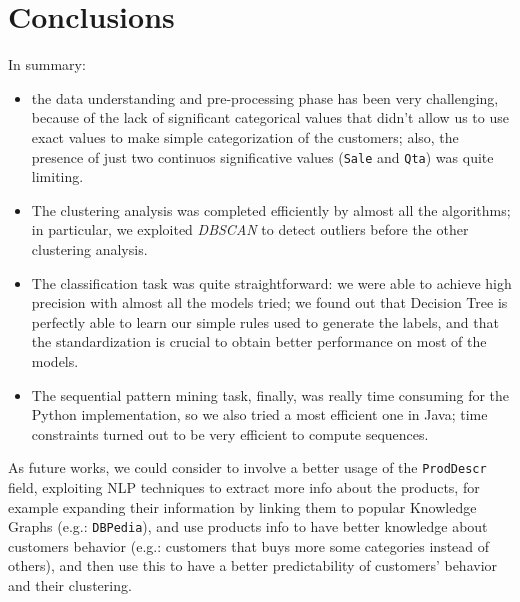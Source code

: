 \documentclass[12pt]{article}
\begin{document}
\section{Conclusions}
In summary:
\begin{itemize}
    \item the data understanding and pre-processing phase has been very challenging, because of the lack of significant categorical values that didn't allow us to use exact values to make simple categorization of the customers; also, the presence of just two continuos significative values (\texttt{Sale} and \texttt{Qta}) was quite limiting.
    \item The clustering analysis was completed efficiently by almost all the algorithms; in particular, we exploited \textit{DBSCAN} to detect outliers before the other clustering analysis.
    \item The classification task was quite straightforward: we were able to achieve high precision with almost all the models tried; we found out that Decision Tree is perfectly able to learn our simple rules used to generate the labels, and that the standardization is crucial to obtain better performance on most of the models.
    \item The sequential pattern mining task, finally, was really time consuming for the Python implementation, so we also tried a most efficient one in Java; time constraints turned out to be very efficient to compute sequences.
\end{itemize}

As future works, we could consider to involve a better usage of the \texttt{ProdDescr} field, exploiting NLP techniques to extract more info about the products, for example expanding their information by linking them to popular Knowledge Graphs (e.g.: \texttt{DBPedia}), and use products info to have better knowledge about customers behavior (e.g.: customers that buys more some categories instead of others), and then use this to have a better predictability of customers' behavior and their clustering. 

\end{document}
